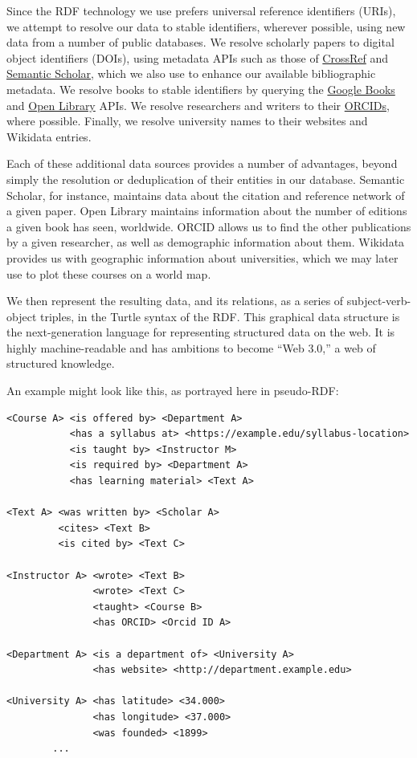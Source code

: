\documentclass[
]{article}
\begin{document}
Since the RDF technology we use prefers universal reference identifiers
(URIs), we attempt to resolve our data to stable identifiers, wherever
possible, using new data from a number of public databases. We resolve
scholarly papers to digital object identifiers (DOIs), using metadata
APIs such as those of \href{https://www.crossref.org/}{CrossRef} and
\href{https://www.semanticscholar.org/}{Semantic Scholar}, which we also
use to enhance our available bibliographic metadata. We resolve books to
stable identifiers by querying the
\href{https://books.google.com/}{Google Books} and
\href{https://openlibrary.org/}{Open Library} APIs. We resolve
researchers and writers to their \href{https://orcid.org/}{ORCIDs},
where possible. Finally, we resolve university names to their websites
and Wikidata entries.

Each of these additional data sources provides a number of advantages,
beyond simply the resolution or deduplication of their entities in our
database. Semantic Scholar, for instance, maintains data about the
citation and reference network of a given paper. Open Library maintains
information about the number of editions a given book has seen,
worldwide. ORCID allows us to find the other publications by a given
researcher, as well as demographic information about them. Wikidata
provides us with geographic information about universities, which we may
later use to plot these courses on a world map.

We then represent the resulting data, and its relations, as a series of
subject-verb-object triples, in the Turtle syntax of the RDF. This
graphical data structure is the next-generation language for
representing structured data on the web. It is highly machine-readable
and has ambitions to become ``Web 3.0,'' a web of structured knowledge.

An example might look like this, as portrayed here in pseudo-RDF:

\begin{verbatim}
<Course A> <is offered by> <Department A>
           <has a syllabus at> <https://example.edu/syllabus-location>
           <is taught by> <Instructor M>
           <is required by> <Department A>
           <has learning material> <Text A>

<Text A> <was written by> <Scholar A>
         <cites> <Text B> 
         <is cited by> <Text C> 

<Instructor A> <wrote> <Text B>
               <wrote> <Text C>
               <taught> <Course B>
               <has ORCID> <Orcid ID A>

<Department A> <is a department of> <University A>
               <has website> <http://department.example.edu>

<University A> <has latitude> <34.000>
               <has longitude> <37.000>
               <was founded> <1899>
        ...
\end{verbatim}
\end{document}
